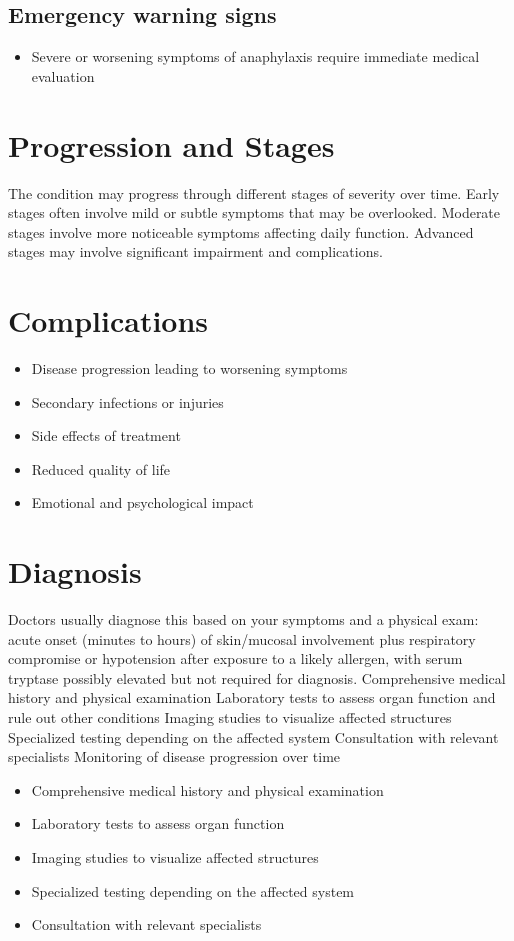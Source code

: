 \subsection{Emergency warning signs}
\begin{itemize}[noitemsep]
  \item Severe or worsening symptoms of anaphylaxis require immediate medical evaluation
\end{itemize}
\section{Progression and Stages}
The condition may progress through different stages of severity over time. Early stages often involve mild or subtle symptoms that may be overlooked. Moderate stages involve more noticeable symptoms affecting daily function. Advanced stages may involve significant impairment and complications.
\section{Complications}
\begin{itemize}[noitemsep]
  \item Disease progression leading to worsening symptoms
  \item Secondary infections or injuries
  \item Side effects of treatment
  \item Reduced quality of life
  \item Emotional and psychological impact
\end{itemize}
\section{Diagnosis}
Doctors usually diagnose this based on your symptoms and a physical exam: acute onset (minutes to hours) of skin/mucosal involvement plus respiratory compromise or hypotension after exposure to a likely allergen, with serum tryptase possibly elevated but not required for diagnosis. Comprehensive medical history and physical examination Laboratory tests to assess organ function and rule out other conditions Imaging studies to visualize affected structures Specialized testing depending on the affected system Consultation with relevant specialists Monitoring of disease progression over time

\begin{itemize}[noitemsep]
  \item Comprehensive medical history and physical examination
  \item Laboratory tests to assess organ function
  \item Imaging studies to visualize affected structures
  \item Specialized testing depending on the affected system
  \item Consultation with relevant specialists
\end{itemize}
